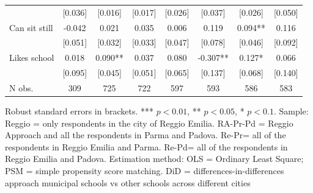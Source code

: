 \documentclass[12pt]{article}
\begin{document}
\begin{table}[ht]
\begin{center}
\begin{adjustbox}{width=1.2\textwidth,center=\textwidth}
\begin{tabular}{lccccccc}
 & [0.036] & [0.016] & [0.017] & [0.026] & [0.037] & [0.026] & [0.050]\\
{Can sit still } & {-0.042 } & {0.021 } & {0.035 } & {0.006 } & {0.119 } & {0.094{*}{*} } & {0.116 }\\
 & [0.051] & [0.032] & [0.033] & [0.047] & [0.078] & [0.046] & [0.092]\\
{Likes school } & {0.018 } & {0.090{*}{*} } & {0.037 } & {0.080 } & {-0.307{*}{*} } & {0.127{*} } & {0.066 }\\
 & [0.095] & [0.045] & [0.051] & [0.065] & [0.137] & [0.068] & [0.140]\\
\hline 
{N obs. } & {309 } & {725 } & {722 } & {597 } & {593 } & {586 } & {583 }\\
\hline 
\end{tabular}
\end{adjustbox}
\end{center}

\begin{footnotesize}
\raggedright{Robust standard errors in brackets. *** $p<0.01$, ** $p<0.05$, * $p<0.1$. Sample: Reggio = only respondents in the city of Reggio Emilia. RA-Pr-Pd = Reggio Approach and all the respondents in Parma and Padova. Re-Pr= all of the respondents in Reggio Emilia and Parma. Re-Pd= all of the respondents in Reggio Emilia and Padova. Estimation method: OLS = Ordinary Least Square; PSM = simple propensity score matching. DiD = differences-in-differences approach municipal schools vs other schools across different cities}
\end{footnotesize}
\end{table}
\end{document}
